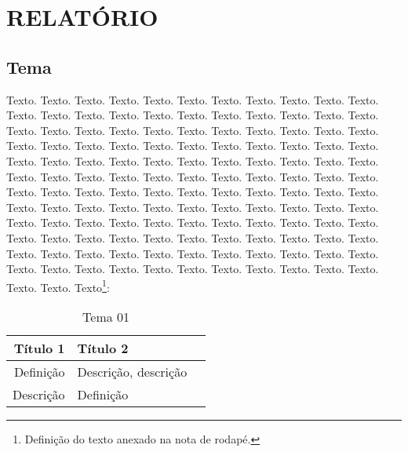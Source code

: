 \section{RELATÓRIO}\label{sec:report}
    \subsection{Tema}

\begin{onehalfspacing}
    \begin{justify}
        \begin{large}
            Texto\cite{livro-qualquer}. Texto. Texto. Texto. Texto. Texto. Texto. Texto. Texto. Texto. Texto. Texto. Texto. Texto. Texto. Texto. Texto. Texto\cite{artigo-de-economia}. Texto. Texto. Texto. Texto. Texto. Texto. Texto. Texto. Texto. Texto. Texto. Texto. Texto. Texto. Texto. Texto. Texto. Texto. Texto. Texto. Texto. Texto. Texto. Texto. Texto. Texto. Texto. Texto. Texto. Texto. Texto. Texto. Texto. Texto. Texto. Texto. Texto. Texto. Texto. Texto. Texto. Texto. Texto. Texto. Texto. Texto. Texto. Texto. Texto. Texto. Texto. Texto. Texto. Texto. Texto. Texto. Texto. Texto. Texto. Texto. Texto. Texto. Texto. Texto. Texto. Texto. Texto. Texto. Texto. Texto. Texto. Texto. Texto. Texto. Texto. Texto. Texto. Texto. Texto. Texto. Texto. Texto. Texto. Texto. Texto. Texto. Texto. Texto. Texto. Texto. Texto. Texto. Texto. Texto. Texto. Texto. Texto. Texto. Texto. Texto. Texto. Texto. Texto. Texto. Texto. Texto. Texto. Texto. Texto. Texto. Texto. Texto. Texto. Texto. Texto. Texto. Texto\footnote[1]{Definição do texto anexado na nota de rodapé.}:
        \end{large}
    \end{justify}
\end{onehalfspacing}

\begin{onehalfspacing}
    \renewcommand\tabularxcolumn[1]{>{\Centering}m{#1}} 
    \begin{table}[ht]
        \begin{center}
            \begin{large}
                \caption{Tema 01}
                \begin{tabular}{r|lr}
                    \hline
                    \textbf{Título 1} & \textbf{Título 2} \\
                    \hline
                    Definição & Descrição, descrição \\
                    Descrição & Definição   \\
                    \hline
                \end{tabular}
            \end{large}
        \end{center}
   \end{table}
\end{onehalfspacing}

